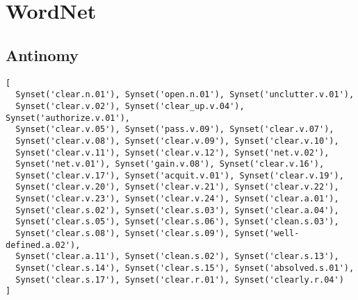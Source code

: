 \section{WordNet}
\label{s:appwordnet}


\subsection{Antinomy}

\begin{verbatim}
[
  Synset('clear.n.01'), Synset('open.n.01'), Synset('unclutter.v.01'), 
  Synset('clear.v.02'), Synset('clear_up.v.04'), Synset('authorize.v.01'), 
  Synset('clear.v.05'), Synset('pass.v.09'), Synset('clear.v.07'), 
  Synset('clear.v.08'), Synset('clear.v.09'), Synset('clear.v.10'), 
  Synset('clear.v.11'), Synset('clear.v.12'), Synset('net.v.02'), 
  Synset('net.v.01'), Synset('gain.v.08'), Synset('clear.v.16'), 
  Synset('clear.v.17'), Synset('acquit.v.01'), Synset('clear.v.19'), 
  Synset('clear.v.20'), Synset('clear.v.21'), Synset('clear.v.22'), 
  Synset('clear.v.23'), Synset('clear.v.24'), Synset('clear.a.01'), 
  Synset('clear.s.02'), Synset('clear.s.03'), Synset('clear.a.04'), 
  Synset('clear.s.05'), Synset('clear.s.06'), Synset('clean.s.03'), 
  Synset('clear.s.08'), Synset('clear.s.09'), Synset('well-defined.a.02'), 
  Synset('clear.a.11'), Synset('clean.s.02'), Synset('clear.s.13'), 
  Synset('clear.s.14'), Synset('clear.s.15'), Synset('absolved.s.01'), 
  Synset('clear.s.17'), Synset('clear.r.01'), Synset('clearly.r.04')
]
\end{verbatim}

